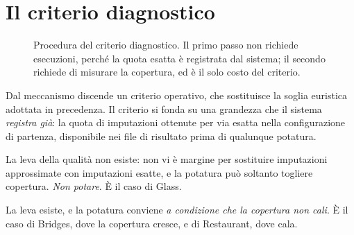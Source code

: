 \section{Il criterio diagnostico}\label{sec:diagnostic}

\begin{figure}[htbp]
\centering
{}
\caption{Procedura del criterio diagnostico. Il primo passo non richiede esecuzioni, perché la
quota esatta è registrata dal sistema; il secondo richiede di misurare la copertura, ed è il solo
costo del criterio.}
\label{fig:criterion}
\end{figure}

Dal meccanismo discende un criterio operativo, che sostituisce la soglia euristica adottata in
precedenza. Il criterio si fonda su una grandezza che il sistema \emph{registra già}: la quota di
imputazioni ottenute per via esatta nella configurazione di partenza, disponibile nei file di
risultato prima di qualunque potatura.

\begin{description}[leftmargin=0em]
    \item[Quota esatta $\approx \SI{100}{\percent}$.] La leva della qualità non esiste: non vi è
    margine per sostituire imputazioni approssimate con imputazioni esatte, e la potatura può
    soltanto togliere copertura. \emph{Non potare}. È il caso di Glass.
    \item[Quota esatta bassa.] La leva esiste, e la potatura conviene \emph{a condizione che la
    copertura non cali}. È il caso di Bridges, dove la copertura cresce, e di Restaurant, dove
    cala.
\end{description}

